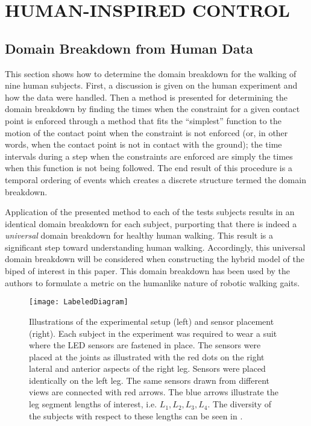 \chapter{\uppercase{Human-Inspired Control}}

\section{Domain Breakdown from Human Data} \label{sec:domainbreakdown} \noindent
This section shows how to determine the domain breakdown for the walking of nine human subjects.  First, a discussion is given on the human experiment and how the data were handled. Then a method is presented for determining the domain breakdown by finding the times when the constraint for a given contact point is enforced through a method that fits the ``simplest'' function to the motion of the contact point when the constraint is not enforced (or, in other words, when the contact point is not in contact with the ground); the time intervals during a step when the constraints are enforced are simply the times when this function is not being followed. The end result of this procedure is a temporal ordering of events which creates a discrete structure termed the domain breakdown.

Application of the presented method to each of the tests subjects results in an identical domain breakdown for each subject, purporting that there is indeed a {\em universal} domain breakdown for healthy human walking. This result is a significant step toward understanding human walking. Accordingly, this universal domain breakdown will be considered when constructing the hybrid model of the biped of interest in this paper. This domain breakdown has been used by the authors to formulate a metric on the humanlike nature of robotic walking gaits.\cite{AVB11,VAB11}

\begin{figure}[t!]
  \centering
  \texttt{[image: LabeledDiagram]}
  \caption{Illustrations of the experimental setup (left) and sensor placement (right). Each subject in the experiment was required to wear a suit where the LED sensors are fastened in place. The sensors were placed at the joints as illustrated with the red dots on the right lateral and anterior aspects of the right leg. Sensors were placed identically on the left leg. The same sensors drawn from different views are connected with red arrows. The blue arrows illustrate the leg segment lengths of interest, i.e. $L_1, L_2, L_3, L_4$. The diversity of the subjects with respect to these lengths can be seen in .}
  \label{fig:Sensors}
\end{figure}

